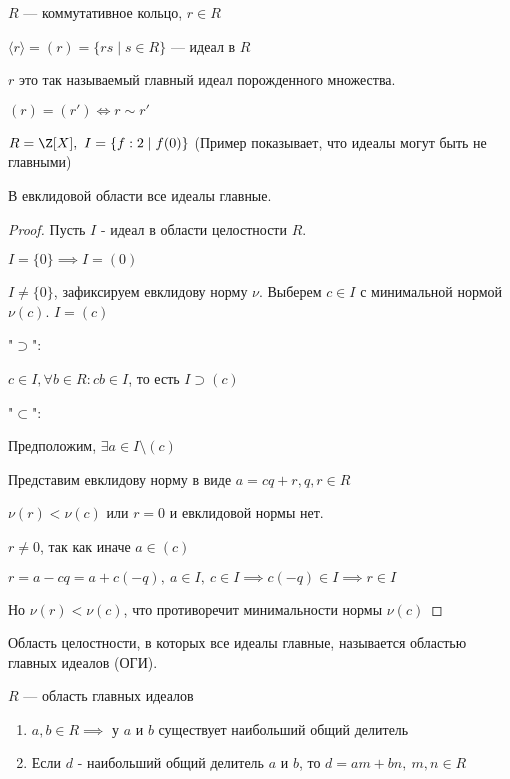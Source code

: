 \begin{defn}
    $R$ --- коммутативное кольцо, $r \in R$

    $\langle r \rangle = (r) = \{ rs \mid s \in R \}$ --- идеал в $R$

    $r$ это так называемый главный идеал порожденного множества.
\end{defn}

\begin{notice}
    $(r) = (r') \iff r \sim r'$
\end{notice}

\begin{example}
    $R = \Z[X],~I = \{ f : 2 \mid f(0) \}$ (Пример показывает, что идеалы могут быть не главными)
\end{example}

\begin{theorem-non}
    В евклидовой области все идеалы главные.
\end{theorem-non}

\begin{proof}
    Пусть $I$ - идеал в области целостности $R$.

    $I = \{0\} \implies I = (0)$

    $I \neq \{0\}$, зафиксируем евклидову норму $\nu$. Выберем $c \in I$ с минимальной нормой $\nu(c)$. $I = (c)$

    "$\supset$":
    
    $c \in I, \forall b \in R: cb \in I$, то есть $I \supset (c)$
    
    "$\subset$":

    Предположим, $\exists a \in I \setminus (c)$

    Представим евклидову норму в виде $a = cq + r, q, r \in R$ 
    
    $\nu(r) < \nu(c)$ или $r = 0$ и евклидовой нормы нет.

    $r \neq 0$, так как иначе $a \in (c)$

    $r = a - cq = a + c(-q),~a \in I,~c \in I \implies c(-q) \in I \implies r \in I$

    Но $\nu(r) < \nu(c)$, что противоречит минимальности нормы $\nu(c)$
\end{proof}

\begin{defn}   
    Область целостности, в которых все идеалы главные, называется областью главных идеалов (ОГИ).
\end{defn}

\begin{theorem-non}
    $R$ --- область главных идеалов

    \begin{enumerate}
        \item $a, b \in R \implies$ у $a$ и $b$ существует наибольший общий делитель
        
        \item Если $d$ - наибольший общий делитель $a$ и $b$, то $d = am + bn,~m, n \in R$
    \end{enumerate}
\end{theorem-non}

